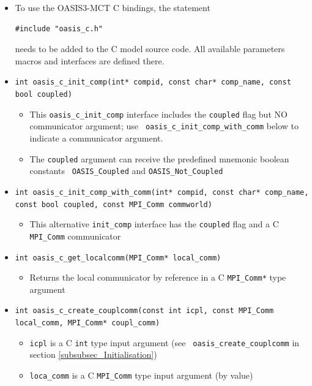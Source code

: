 \vspace{0.2cm}
\begin{itemize}

\item To use the OASIS3-MCT C bindings, the statement
\begin{verbatim}
#include "oasis_c.h"
\end{verbatim}
needs to be added to the C model source code.  All available
parameters macros and
interfaces are defined there.

\item {\tt int oasis\_c\_init\_comp(int* compid, const char* comp\_name, const bool coupled)}
  \begin{itemize}
  \item This {\tt oasis\_c\_init\_comp} interface includes the {\tt coupled} flag but
    NO communicator argument; use  {\tt
      oasis\_c\_init\_comp\_with\_comm} below to indicate a
    communicator argument.
    \item The {\tt coupled} argument can receive the predefined mnemonic boolean constants {\tt
      OASIS\_Coupled} and {\tt OASIS\_Not\_Coupled}
  \end{itemize}

\vspace{0.2cm}
\item {\tt int oasis\_c\_init\_comp\_with\_comm(int* compid, const char* comp\_name, const bool coupled, const MPI\_Comm commworld)}
  \begin{itemize}
  \item This alternative {\tt init\_comp} interface has the {\tt coupled} flag and a C {\tt MPI\_Comm} communicator
  \end{itemize}

\vspace{0.2cm}
\item {\tt int oasis\_c\_get\_localcomm(MPI\_Comm* local\_comm)}
  \begin{itemize}
  \item Returns the local communicator by reference in a C {\tt MPI\_Comm*} type argument
  \end{itemize}

\vspace{0.2cm}
\item {\tt int oasis\_c\_create\_couplcomm(const int icpl, const MPI\_Comm local\_comm, MPI\_Comm* coupl\_comm)}
  \begin{itemize}
  \item {\tt icpl} is a C {\tt int} type input argument (see {\tt
      oasis\_create\_couplcomm} in section \ref{subsubsec_Initialisation})
  \item {\tt loca\_comm} is a C {\tt MPI\_Comm} type input argument (by value)


\end{itemize}
\end{itemize}
